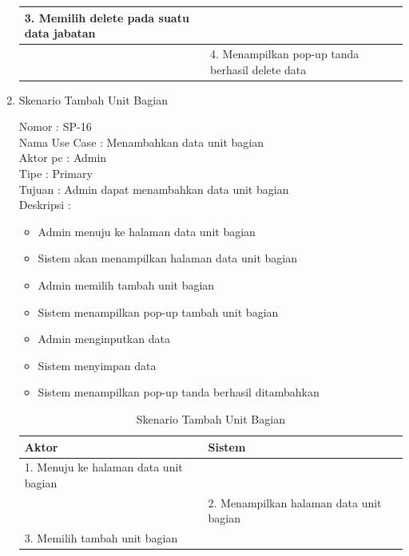 \begin{enumerate}
\begin{table}
\begin{tabular}{ | p{55mm} | p{70mm}|}
		\hline
		
		3. Memilih delete pada suatu data jabatan & \\
		
		\hline
		
		& 4.	Menampilkan pop-up tanda berhasil delete data \\
		\hline
		
	\end{tabular}
\end{table}

\item Skenario Tambah Unit Bagian

Nomor \kern 3.6pc : SP-16 \\
Nama Use Case : Menambahkan data unit bagian \\
Aktor  pc : Admin \\
Tipe \kern 4.6pc : Primary \\
Tujuan \kern 3.6pc : Admin dapat menambahkan data unit bagian \\
Deskripsi \kern 2.5pc : 

\begin{itemize}
	\item Admin menuju ke halaman data unit bagian
	\item Sistem akan menampilkan halaman data unit bagian
	\item Admin memilih tambah unit bagian
	\item Sistem menampilkan pop-up tambah unit bagian
	\item Admin menginputkan data
	\item Sistem menyimpan data
	\item Sistem menampilkan pop-up tanda berhasil ditambahkan
	
\end{itemize}

\begin{table}
	\caption{Skenario Tambah Unit Bagian}
	\centering
	\begin{tabular}{ | p{55mm} | p{70mm} |}
		\hline 
		\textbf{Aktor} & \textbf{Sistem} \\
		\hline
		
		1.	Menuju ke halaman data unit bagian &  \\
		
		\hline
		
		&  2.	Menampilkan halaman data unit bagian \\
		
		\hline
		
		3. Memilih tambah unit bagian & \\
		

\end{tabular}
\end{table}
\end{enumerate}
